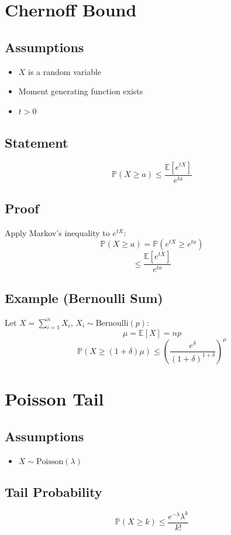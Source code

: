\documentclass[12pt]{article}
\begin{document}
\section{Chernoff Bound}

\subsection{Assumptions}
\begin{itemize}
    \item $X$ is a random variable
    \item Moment generating function exists
    \item $t > 0$
\end{itemize}

\subsection{Statement}
\[
\mathbb{P}(X \geq a) \leq \frac{\mathbb{E}[e^{tX}]}{e^{ta}}
\]

\subsection{Proof}
Apply Markov’s inequality to $e^{tX}$:
\[
\mathbb{P}(X \geq a) = \mathbb{P}(e^{tX} \geq e^{ta})
\]
\[
\leq \frac{\mathbb{E}[e^{tX}]}{e^{ta}}
\]

\subsection{Example (Bernoulli Sum)}
Let $X = \sum_{i=1}^n X_i$, $X_i \sim \text{Bernoulli}(p)$:
\[
\mu = \mathbb{E}[X] = np
\]
\[
\mathbb{P}(X \geq (1+\delta)\mu) \leq \left(\frac{e^\delta}{(1+\delta)^{1+\delta}}\right)^\mu
\]

\section{Poisson Tail}

\subsection{Assumptions}
\begin{itemize}
    \item $X \sim \text{Poisson}(\lambda)$
\end{itemize}

\subsection{Tail Probability}
\[
\mathbb{P}(X \geq k) \leq \frac{e^{-\lambda}\lambda^k}{k!}
\]
\end{document}
